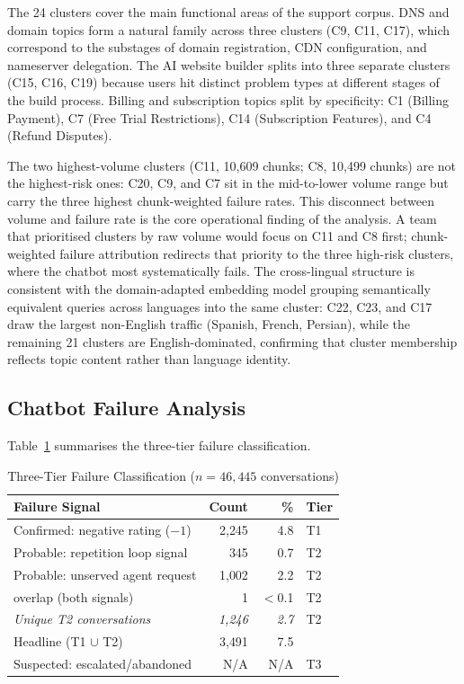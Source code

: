 \documentclass[conference]{IEEEtran}
\begin{document}
The 24 clusters cover the main functional areas of the support corpus. DNS and domain topics form a natural family across three clusters (C9, C11, C17), which correspond to the substages of domain registration, CDN configuration, and nameserver delegation. The AI website builder splits into three separate clusters (C15, C16, C19) because users hit distinct problem types at different stages of the build process. Billing and subscription topics split by specificity: C1 (Billing Payment), C7 (Free Trial Restrictions), C14 (Subscription Features), and C4 (Refund Disputes).

The two highest-volume clusters (C11, 10{,}609 chunks; C8, 10{,}499 chunks) are not the highest-risk ones: C20, C9, and C7 sit in the mid-to-lower volume range but carry the three highest chunk-weighted failure rates. This disconnect between volume and failure rate is the core operational finding of the analysis. A team that prioritised clusters by raw volume would focus on C11 and C8 first; chunk-weighted failure attribution redirects that priority to the three high-risk clusters, where the chatbot most systematically fails. The cross-lingual structure is consistent with the domain-adapted embedding model grouping semantically equivalent queries across languages into the same cluster: C22, C23, and C17 draw the largest non-English traffic (Spanish, French, Persian), while the remaining 21 clusters are English-dominated, confirming that cluster membership reflects topic content rather than language identity.

\subsection{Chatbot Failure Analysis}
\label{sec:failure-results}

Table~\ref{tab:failure} summarises the three-tier failure classification.

\begin{table}[!t]
\caption{Three-Tier Failure Classification ($n{=}46{,}445$ conversations)}
\label{tab:failure}
\centering
\begin{tabular}{lrrl}
\toprule
Failure Signal & Count & \% & Tier \\
\midrule
Confirmed: negative rating ($-1$)    & 2{,}245 & 4.8 & T1 \\
Probable: repetition loop signal     &   345   & 0.7 & T2 \\
Probable: unserved agent request     & 1{,}002 & 2.2 & T2 \\
\quad overlap (both signals)         &     1   & $<$0.1 & T2 \\
\textit{Unique T2 conversations}     & \textit{1{,}246} & \textit{2.7} & T2 \\
\midrule
Headline (T1 $\cup$ T2)     & 3{,}491 & 7.5 & \\
Suspected: escalated/abandoned       & N/A & N/A & T3 \\
\bottomrule
\end{tabular}
\end{table}
\end{document}
